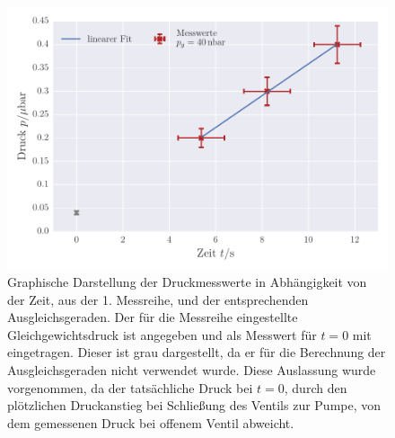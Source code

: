 \begin{figure}[!h]
 \centering \includegraphics[scale=0.65]{../Grafiken/Leckrate_Turbo_0.pdf}                                                          
 \caption{Graphische Darstellung der Druckmesswerte in Abhängigkeit von der Zeit, aus der 1. Messreihe, und der
 	entsprechenden Ausgleichsgeraden. Der für die Messreihe eingestellte Gleichgewichtsdruck ist angegeben und als Messwert für $t=0$ mit eingetragen. Dieser ist grau dargestellt, da er für die 
 	Berechnung der Ausgleichsgeraden nicht verwendet wurde. Diese Auslassung wurde vorgenommen, da
 	der tatsächliche Druck bei $t=0$, durch den plötzlichen Druckanstieg bei Schließung des Ventils zur Pumpe, von dem
 	gemessenen Druck bei offenem Ventil abweicht.   \label{fig:leckrate_turbo_0}}
 \end{figure} 